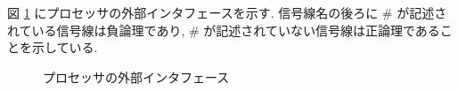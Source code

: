 \documentclass[../specifications.tex]{subfiles}
\begin{document}
  図 \ref{fig:external-interface} にプロセッサの外部インタフェースを示す.
  信号線名の後ろに \# が記述されている信号線は負論理であり, 
  \# が記述されていない信号線は正論理であることを示している.

  \begin{figure}[h]
    \centering
    \caption{プロセッサの外部インタフェース}
    \label{fig:external-interface}
  \end{figure}
\end{document}
